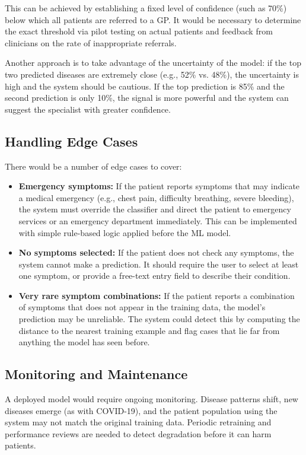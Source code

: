 This can be achieved by establishing a fixed level of confidence (such as 70\%) below which all patients are referred to a GP. It would be necessary to determine the exact threshold via pilot testing on actual patients and feedback from clinicians on the rate of inappropriate referrals.

Another approach is to take advantage of the uncertainty of the model: if the top two predicted diseases are extremely close (e.g., 52\% vs. 48\%), the uncertainty is high and the system should be cautious. If the top prediction is 85\% and the second prediction is only 10\%, the signal is more powerful and the system can suggest the specialist with greater confidence.

\subsection{Handling Edge Cases}

There would be a number of edge cases to cover:

\begin{itemize}
    \item \textbf{Emergency symptoms:} If the patient reports symptoms that may indicate a medical emergency (e.g., chest pain, difficulty breathing, severe bleeding), the system must override the classifier and direct the patient to emergency services or an emergency department immediately. This can be implemented with simple rule-based logic applied before the ML model.
    \item \textbf{No symptoms selected:} If the patient does not check any symptoms, the system cannot make a prediction. It should require the user to select at least one symptom, or provide a free-text entry field to describe their condition.
    \item \textbf{Very rare symptom combinations:} If the patient reports a combination of symptoms that does not appear in the training data, the model's prediction may be unreliable. The system could detect this by computing the distance to the nearest training example and flag cases that lie far from anything the model has seen before.
\end{itemize}

\subsection{Monitoring and Maintenance}

A deployed model would require ongoing monitoring. Disease patterns shift, new diseases emerge (as with COVID-19), and the patient population using the system may not match the original training data. Periodic retraining and performance reviews are needed to detect degradation before it can harm patients.

